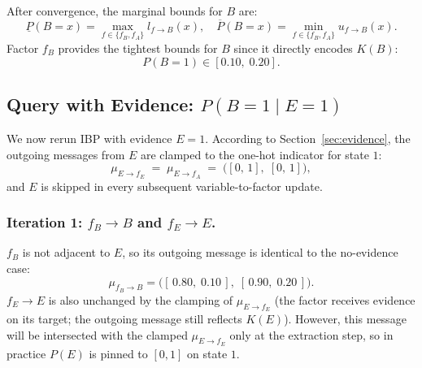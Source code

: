\documentclass[11pt]{article}
\begin{document}
After convergence, the marginal bounds for $B$ are:
\[
  \underline{P}(B{=}x) = \max_{f \in \{f_B, f_A\}} l_{f \to B}(x), \quad
  \overline{P}(B{=}x) = \min_{f \in \{f_B, f_A\}} u_{f \to B}(x).
\]
Factor $f_B$ provides the tightest bounds for $B$ since it directly encodes $K(B)$:
\[
  P(B{=}1) \in [0.10,\; 0.20].
\]

\subsection{Query with Evidence: $P(B{=}1 \mid E{=}1)$}\label{sec:example-evidence}

We now rerun IBP with evidence $E = 1$. According to Section~\ref{sec:evidence},
the outgoing messages from $E$ are clamped to the one-hot indicator for state
$1$:
\[
  \mu_{E \to f_E} \;=\; \mu_{E \to f_A} \;=\; \bigl([0,\, 1],\; [0,\, 1]\bigr),
\]
and $E$ is skipped in every subsequent variable-to-factor update.

\subsubsection{Iteration 1: $f_B \to B$ and $f_E \to E$.}
$f_B$ is not adjacent to $E$, so its outgoing message is identical to the
no-evidence case:
\[
  \mu_{f_B \to B} = \bigl([\,0.80,\; 0.10\,],\; [\,0.90,\; 0.20\,]\bigr).
\]
$f_E \to E$ is also unchanged by the clamping of $\mu_{E \to f_E}$ (the factor
receives evidence on its target; the outgoing message still reflects
$K(E)$). However, this message will be intersected with the clamped
$\mu_{E \to f_E}$ only at the extraction step, so in practice $P(E)$ is pinned
to $[0, 1]$ on state $1$.
\end{document}
